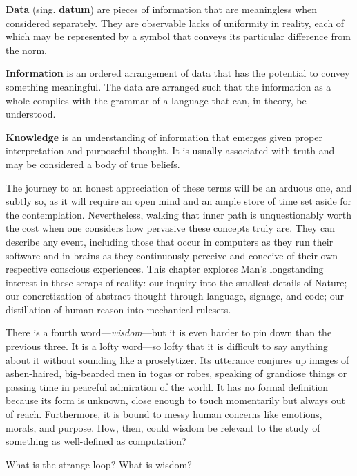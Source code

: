 \vspace{4mm}
\begin{displayquote}
    \textbf{Data} (sing. \textbf{datum}) are pieces of information that are meaningless when considered separately. They are observable lacks of uniformity in reality, each of which may be represented by a symbol that conveys its particular difference from the norm.

    \textbf{Information} is an ordered arrangement of data that has the potential to convey something meaningful. The data are arranged such that the information as a whole complies with the grammar of a language that can, in theory, be understood.

    \textbf{Knowledge} is an understanding of information that emerges given proper interpretation and purposeful thought. It is usually associated with truth and may be considered a body of true beliefs.
\end{displayquote}
\vspace{4mm}

The journey to an honest appreciation of these terms will be an arduous one, and subtly so, as it will require an open mind and an ample store of time set aside for the contemplation. Nevertheless, walking that inner path is unquestionably worth the cost when one considers how pervasive these concepts truly are. They can describe any event, including those that occur in computers as they run their software and in brains as they continuously perceive and conceive of their own respective conscious experiences. This chapter explores Man's longstanding interest in these scraps of reality: our inquiry into the smallest details of Nature; our concretization of abstract thought through language, signage, and code; our distillation of human reason into mechanical rulesets.

There is a fourth word---\textit{wisdom}---but it is even harder to pin down than the previous three. It is a lofty word---so lofty that it is difficult to say anything about it without sounding like a proselytizer. Its utterance conjures up images of ashen-haired, big-bearded men in togas or robes, speaking of grandiose things or passing time in peaceful admiration of the world. It has no formal definition because its form is unknown, close enough to touch momentarily but always out of reach. Furthermore, it is bound to messy human concerns like emotions, morals, and purpose. How, then, could wisdom be relevant to the study of something as well-defined as computation?







What is the strange loop? What is wisdom?

